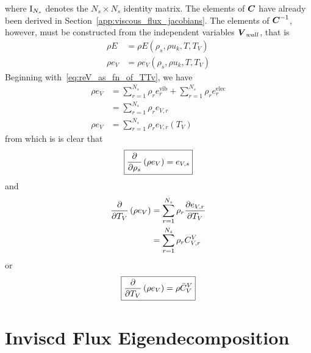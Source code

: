 where ${\boldsymbol{\text{I}}}_{N_s}$ denotes the $N_s \times N_s$ identity matrix.  The elements of ${\boldsymbol{C}}$ have already been derived in Section~\ref{app:viscous_flux_jacobians}.  The elements of ${\boldsymbol{C}}^{-1}$, however, must be constructed from the independent variables ${\boldsymbol{V}}_{wall}$, that is
\begin{align}
  \rho E   &= \rho E\left(\rho_s, \rho u_k, T, T_V\right) \label{eq:rE_as_fn_of_TTv} \\
  \rho e_V &= \rho e_V\left(\rho_s, \rho u_k, T, T_V\right) \label{eq:reV_as_fn_of_TTv}
\end{align}
Beginning with~\eqref{eq:reV_as_fn_of_TTv}, we have
\begin{align*}
  \rho e_V &= \sum_{r=1}^{N_s} \rho_r e^{\text{vib}}_r + \sum_{r=1}^{N_s} \rho_r e^{\text{elec}}_r  \\
           &= \sum_{r=1}^{N_s} \rho_r e_{V,r} \\
   \rho e_V &= \sum_{r=1}^{N_s} \rho_r e_{V,r}\left(T_V\right)
\end{align*}
from which is is clear that
\begin{equation}
  \boxed{{\frac{\partial{}}{\partial{\rho_s}}}\left(\rho e_V\right) = e_{V,s}}
\end{equation}
and
\begin{align*}
  {\frac{\partial{}}{\partial{T_V}}}\left(\rho e_V\right) &= \sum_{r=1}^{N_s} \rho_r {\frac{\partial{e_{V,r}}}{\partial{T_V}}} \\
                                   &= \sum_{r=1}^{N_s} \rho_r C_{V,r}^V
\end{align*}
or
\begin{equation}
  \boxed{{\frac{\partial{}}{\partial{T_V}}}\left(\rho e_V\right) = \rho \bar{C}_V^V}
\end{equation}



\section{Inviscd Flux Eigendecomposition\label{app:inviscd_flux_eigendecomposition}}

